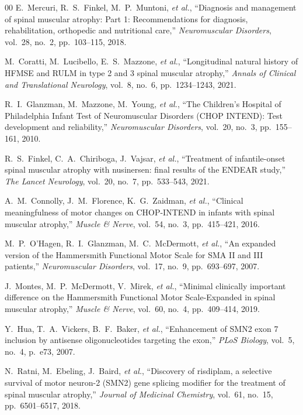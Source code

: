 \documentclass[journal]{IEEEtran}
\begin{document}
\begin{thebibliography}{00}
E.~Mercuri, R.~S.~Finkel, M.~P.~Muntoni, \textit{et al.}, ``Diagnosis and management of spinal muscular atrophy: Part 1: Recommendations for diagnosis, rehabilitation, orthopedic and nutritional care,'' \textit{Neuromuscular Disorders}, vol.~28, no.~2, pp.~103--115, 2018.

M.~Coratti, M.~Lucibello, E.~S.~Mazzone, \textit{et al.}, ``Longitudinal natural history of HFMSE and RULM in type 2 and 3 spinal muscular atrophy,'' \textit{Annals of Clinical and Translational Neurology}, vol.~8, no.~6, pp.~1234--1243, 2021.

R.~I.~Glanzman, M.~Mazzone, M.~Young, \textit{et al.}, ``The Children's Hospital of Philadelphia Infant Test of Neuromuscular Disorders (CHOP INTEND): Test development and reliability,'' \textit{Neuromuscular Disorders}, vol.~20, no.~3, pp.~155--161, 2010.

R.~S.~Finkel, C.~A.~Chiriboga, J.~Vajsar, \textit{et al.}, ``Treatment of infantile-onset spinal muscular atrophy with nusinersen: final results of the ENDEAR study,'' \textit{The Lancet Neurology}, vol.~20, no.~7, pp.~533--543, 2021.

A.~M.~Connolly, J.~M.~Florence, K.~G.~Zaidman, \textit{et al.}, ``Clinical meaningfulness of motor changes on CHOP-INTEND in infants with spinal muscular atrophy,'' \textit{Muscle \& Nerve}, vol.~54, no.~3, pp.~415--421, 2016.

M.~P.~O'Hagen, R.~I.~Glanzman, M.~C.~McDermott, \textit{et al.}, ``An expanded version of the Hammersmith Functional Motor Scale for SMA II and III patients,'' \textit{Neuromuscular Disorders}, vol.~17, no.~9, pp.~693--697, 2007.

J.~Montes, M.~P.~McDermott, V.~Mirek, \textit{et al.}, ``Minimal clinically important difference on the Hammersmith Functional Motor Scale-Expanded in spinal muscular atrophy,'' \textit{Muscle \& Nerve}, vol.~60, no.~4, pp.~409--414, 2019.

Y.~Hua, T.~A.~Vickers, B.~F.~Baker, \textit{et al.}, ``Enhancement of SMN2 exon 7 inclusion by antisense oligonucleotides targeting the exon,'' \textit{PLoS Biology}, vol.~5, no.~4, p.~e73, 2007.

N.~Ratni, M.~Ebeling, J.~Baird, \textit{et al.}, ``Discovery of risdiplam, a selective survival of motor neuron-2 (SMN2) gene splicing modifier for the treatment of spinal muscular atrophy,'' \textit{Journal of Medicinal Chemistry}, vol.~61, no.~15, pp.~6501--6517, 2018.


\end{thebibliography}
\end{document}
